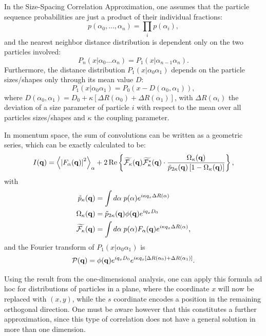 In the Size-Spacing Correlation Approximation, one assumes that the particle sequence probabilities are just a product of their individual fractions:
\begin{equation*}
  p(\alpha_0,\dotsc ,\alpha_n) = \prod_i p(\alpha_i),
\end{equation*}
and the nearest neighbor distance distribution is dependent only on the two particles involved:
\begin{equation*}
  P_n(x|\alpha_0\dotsc\alpha_n) = P_1(x|\alpha_{n-1}\alpha_n).
\end{equation*}
Furthermore, the distance distribution $P_1(x|\alpha_0\alpha_1)$ depends on the particle sizes/shapes only through its mean value $D$:
\begin{equation*}
  P_1(x|\alpha_0\alpha_1) = P_0(x - D(\alpha_0,\alpha_1) ),
\end{equation*}
where $D(\alpha_0,\alpha_1) = D_0 + \kappa \left[ \Delta R(\alpha_0) + \Delta R(\alpha_1) \right]$, with $\Delta R(\alpha_i)$ the deviation of a size parameter of particle $i$ with respect to the mean over all particles sizes/shapes and $\kappa$ the coupling parameter.

In momentum space, the sum of convolutions can be written as a geometric series, which can be exactly calculated to be:
\begin{equation}
\label{Esscainf}
I(\mathbf{q} ) = {\left\langle\left| F_\alpha(\mathbf{q} ) \right| ^2\right\rangle}_{\alpha}
+ 2 \operatorname{Re} \left\lbrace \widetilde{\mathcal{F}_\kappa}(\mathbf{q} )
 \widetilde{\mathcal{F}_\kappa^*}(\mathbf{q} ) \cdot
 \frac{\Omega_\kappa(\mathbf{q} )}{\tilde{p}_{2\kappa}(\mathbf{q} )\left
   [ 1 - \Omega_\kappa(\mathbf{q} )\right] } \right\rbrace,
\end{equation}
with
\begin{align*}
  \tilde{p}_\kappa(\mathbf{q} ) &= \int d\alpha\; p(\alpha) e^{i\kappa q_x \Delta R(\alpha)}  \\
  \Omega_\kappa(\mathbf{q} ) &= \tilde{p}_{2\kappa}(\mathbf{q} ) \phi(\mathbf{q}) e^{i q_x D_0}  \\
  \widetilde{\mathcal{F}_\kappa}(\mathbf{q} ) &= \int d\alpha\; p(\alpha)F_\alpha (\mathbf{q} ) e^{i\kappa q_x \Delta R(\alpha)},
\end{align*}
and the Fourier transform of $P_1(x|\alpha_0\alpha_1)$ is
\begin{equation*}
  \mathcal{P} (\mathbf{q} ) = \phi (\mathbf{q} )e^{i q_x D_0} e^{i \kappa q_x \left[ \Delta R(\alpha_0) + \Delta R(\alpha_1) \right] }.
\end{equation*}

Using the result from the one-dimensional analysis, one can apply this formula ad hoc for distributions of particles in a plane, where the coordinate $x$ will now be replaced with $(x,y)$, while the $s$ coordinate encodes a position in the remaining orthogonal direction. One must be aware however that this constitutes a further approximation, since this type of correlation does not have a general solution in more than one dimension.

